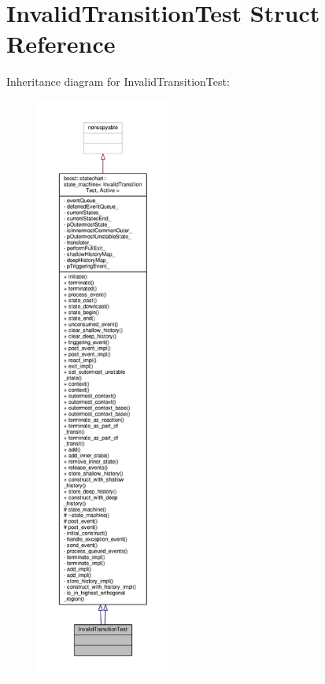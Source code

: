 \hypertarget{struct_invalid_transition_test}{}\section{Invalid\+Transition\+Test Struct Reference}
\label{struct_invalid_transition_test}


Inheritance diagram for Invalid\+Transition\+Test\+:
\nopagebreak
\begin{figure}[H]
\begin{center}
\leavevmode
\includegraphics[height=550pt]{struct_invalid_transition_test__inherit__graph}
\end{center}
\end{figure}


